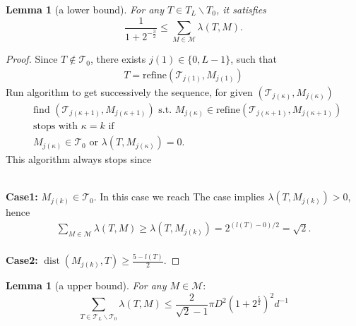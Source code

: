 \documentclass[a4paper,12pt,oneside,fleqn]{book}
\newtheorem{lemma}[theorem]{Lemma}
\theoremstyle{definition}
\theoremstyle{remark}
\DeclareMathOperator*{\dist}{dist}
\begin{document}
\begin{lemma}[a lower bound]
For any $T \in T_L \backslash T_0$, it satisfies
\begin{equation}
	\frac{1}{1 + 2^{- \frac{3}{2}}} \le \sum_{M \in \mathcal{M}} \lambda(T, M).
\end{equation}
\end{lemma}
\begin{proof}
Since $T \notin \mathcal{T}_0$, there exists $j(1) \in \{0, L -1\}$, such that
\begin{align*}
	T = \text{refine}(\mathcal{T}_{j(1)}, M_{j(1)})
\end{align*} 
Run algorithm to get successively the sequence, for given $(\mathcal{T}_{j(\kappa)}, M_{j(\kappa)})$
\begin{align*}
	& \text{find }(\mathcal{T}_{j(\kappa + 1)}, M_{j(\kappa + 1)}) \text{ s.t. }  M_{j(\kappa)} \in \text{refine}(\mathcal{T}_{j(\kappa + 1)}, M_{j(\kappa + 1)})\\
	& \text{stops with } \kappa = k \text{ if} \\
	&M_{j(\kappa)} \in \mathcal{T}_0 \text{ or } \lambda(T, M_{j(\kappa)}) = 0. 
\end{align*}
This algorithm always stops since 



\quad\\
\textbf{Case1:}  $M_{j(k)} \in \mathcal{T}_0$. In this case we reach The case implies $\lambda(T, M_{j(k)}) > 0$, hence
\begin{align*}
	\sum_{M \in \mathcal{M}} \lambda(T, M) \ge \lambda(T, M_{j(k)}) = 2^{(l(T) - 0)\slash 2}  = \sqrt{2}.
\end{align*}
\qquad\\
\textbf{Case2:} $\dist(M_{j(k)}, T) \ge \frac{5 - l(T)}{2}$.
\end{proof}

\begin{lemma}[a upper bound]
	For any $M \in \mathcal{M}:$
	\begin{equation}
		\sum_{T \in \mathcal{T}_L \backslash \mathcal{T}_0} \lambda(T, M) \le \frac{2}{\sqrt{2} -1 } \pi D^2 (1 + 2^{\frac{5}{2}})^2 d^{-1}
	\end{equation}
\end{lemma}
\end{document}
